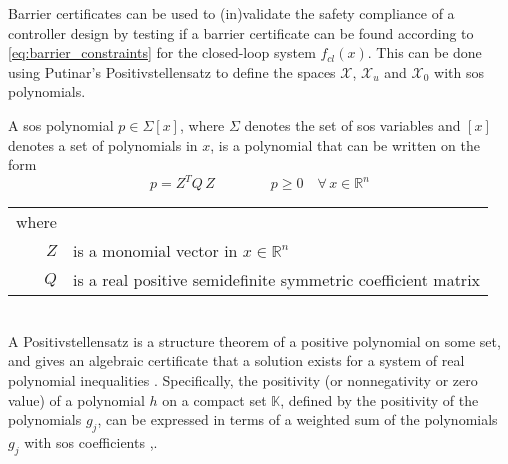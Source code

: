 Barrier certificates can be used to (in)validate the safety compliance of a controller design by testing if a barrier certificate can be found according to \autoref{eq:barrier_constraints} for the closed-loop system $f_{cl}(x)$. This can be done using Putinar's Positivstellensatz to define the spaces $\mathcal{X}$, $\mathcal{X}_u$ and $\mathcal{X}_0$ with \gls{sos} polynomials. 

A \gls{sos} polynomial $p\in \Sigma[x]$, where $\Sigma$ denotes the set of \gls{sos} variables and $[x]$ denotes a set of polynomials in $x$, is a polynomial that can be written on the form \citep{bib:sostools}
\begin{equation}
p = Z^T Q \, Z \qquad\qquad p\geq 0 \quad \forall \, x\in\mathbb{R}^n %
\label{eq:sos_polynomial}
\end{equation}
\begin{tabular}{rl}
where &\\
$Z$ & is a monomial vector in $x\in \mathbb{R}^n$\\
$Q$ & is a real positive semidefinite symmetric coefficient matrix\\
\end{tabular}\\

A Positivstellensatz is a structure theorem of a positive polynomial on some set, and gives an algebraic certificate that a solution exists for a system of real polynomial inequalities \citep{bib:positivstellensatz}. 
Specifically, the positivity (or nonnegativity or zero value) of a polynomial $h$ on a compact set $\mathbb{K}$, defined by the positivity of the polynomials $g_j$, can be expressed in terms of a weighted sum of the polynomials $g_j$ with \gls{sos} coefficients \citep[pp 184-186]{bib:sos_putinar_laurent},\citep[pp 28-29]{bib:sos_putinar_lasserre}.\\


